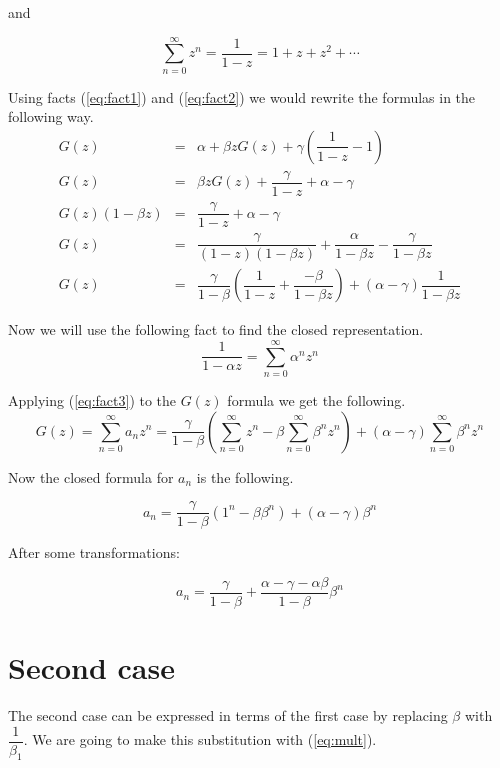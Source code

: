 \documentclass{article}
\begin{document}
and 

\begin{equation}
  \sum\limits_{n=0}^{\infty}{z^n} = \dfrac{1}{1 - z} 
  = 1 + z + z^2 + \cdots
  \label{eq:fact2}
\end{equation}

Using facts (\ref{eq:fact1}) and (\ref{eq:fact2}) we would rewrite the 
formulas in the following way.
\begin{eqnarray*}
  G(z) &=& \alpha + \beta z G(z) + 
	   \gamma \left(\dfrac{1}{1-z} - 1\right) \\
  G(z) &=& \beta z G(z) + \dfrac{\gamma}{1-z} + \alpha - \gamma \\
  G(z)(1 - \beta z) &=& \dfrac{\gamma}{1-z} + \alpha - \gamma \\
  G(z) &=& \dfrac{\gamma}{(1-z)(1 -\beta z)} + \dfrac{\alpha}{1 - \beta z}
	   - \dfrac{\gamma}{1 - \beta z} \\
  G(z) &=& \dfrac{\gamma}{1 - \beta} 
	   \left(\dfrac{1}{1-z} + \dfrac{-\beta}{1 - \beta z}\right)
	   + \left(\alpha - \gamma\right) \dfrac{1}{1 - \beta z}
\end{eqnarray*}

Now we will use the following fact to find the closed representation.
\begin{equation}
  \dfrac{1}{1 - \alpha z} = \sum\limits_{n = 0}^{\infty}{\alpha^n z^n}
  \label{eq:fact3}
\end{equation}

Applying (\ref{eq:fact3}) to the $G(z)$ formula we get the following.
$$
  G(z) = \sum\limits_{n=0}^{\infty}{a_n z^n} =
	 \dfrac{\gamma}{1 - \beta} 
	 \left(\sum\limits_{n=0}^{\infty}{z^n}
	       - \beta\sum\limits_{n=0}^{\infty}{\beta^n z^n} \right)
	 + \left(\alpha - \gamma\right) 
	   \sum\limits_{n=0}^{\infty}{\beta^n z^n}
$$

Now the closed formula for $a_n$ is the following.

$$
  a_n = \dfrac{\gamma}{1 - \beta}
	   \left(1^n -\beta\beta^n\right)
	   + \left(\alpha - \gamma\right) \beta^n
$$

After some transformations:

\begin{equation}
  a_n = \dfrac{\gamma}{1 - \beta} 
	+ \dfrac{\alpha - \gamma - \alpha\beta}{1 - \beta} \beta^n
  \label{eq:mult}
\end{equation}

\section{Second case}
The second case can be expressed in terms of the first case by 
replacing $\beta$ with $\dfrac{1}{\beta_1}$. We are going to make
this substitution with (\ref{eq:mult}).
\end{document}
